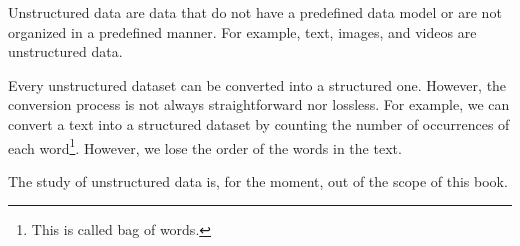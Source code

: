 Unstructured data are data that do not have a predefined data model or are not organized
in a predefined manner.  For example, text, images, and videos are unstructured data.

Every unstructured dataset can be converted into a structured one.  However, the
conversion process is not always straightforward nor lossless.  For example, we can
convert a text into a structured dataset by counting the number of occurrences of each
word\footnote{This is called bag of words.}.
However, we lose the order of the words in the text.

The study of unstructured data is, for the moment, out of the scope of this book.

